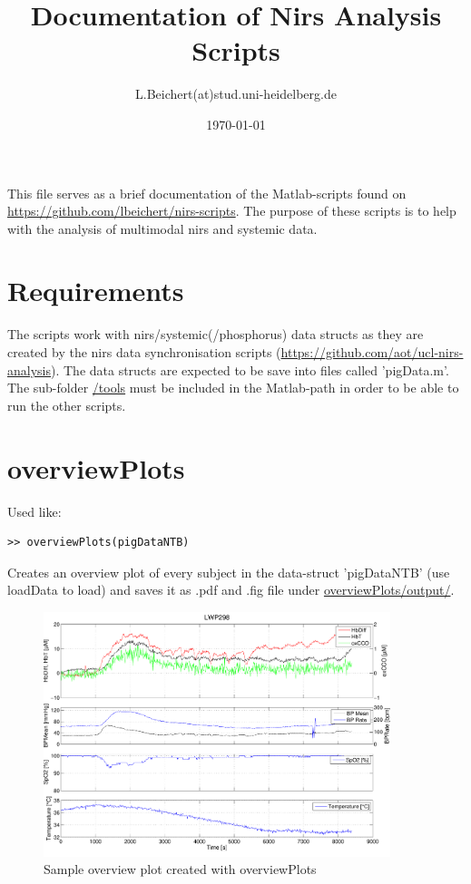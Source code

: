 \documentclass[10pt, a4paper]{article}
\title{Documentation of Nirs Analysis Scripts}
\author{L.Beichert(at)stud.uni-heidelberg.de}
\date{\today}
\begin{document}
\maketitle
\section*{}
This file serves as a brief documentation of the Matlab-scripts found on \url{https://github.com/lbeichert/nirs-scripts}. The purpose of these scripts is to help with the analysis of multimodal nirs and systemic data.
\section{Requirements}
The scripts work with nirs/systemic(/phosphorus) data structs as they are created by the nirs data synchronisation scripts (\url{https://github.com/aot/ucl-nirs-analysis}).
The data structs are expected to be save into files called 'pigData.m'.
The sub-folder \url{/tools} must be included in the Matlab-path in order to be able to run the other scripts.

\section{overviewPlots}
Used like:

\begin{lstlisting}
>> overviewPlots(pigDataNTB)
\end{lstlisting}

Creates an overview plot of every subject in the data-struct 'pigDataNTB' (use loadData to load) and saves it as .pdf and .fig file under \url{overviewPlots/output/}.

\begin{figure}[h]
\includegraphics[width=0.9\textwidth]{LWP298_Argon_Raw.pdf}
\caption{Sample overview plot created with overviewPlots}
\end{figure}
\end{document}
